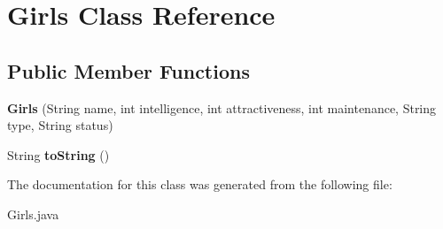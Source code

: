 \hypertarget{class_girls}{}\section{Girls Class Reference}
\label{class_girls}
\subsection*{Public Member Functions}
\begin{DoxyCompactItemize}
\item 
\mbox{\label{class_girls_a06ebadf127a171d48c408ec5909c43be}} 
{\bfseries Girls} (String name, int intelligence, int attractiveness, int maintenance, String type, String status)
\item 
\mbox{\label{class_girls_a4aafc646016319aa597e48502e756b65}} 
String {\bfseries to\+String} ()
\end{DoxyCompactItemize}


The documentation for this class was generated from the following file\+:\begin{DoxyCompactItemize}
\item 
Girls.\+java\end{DoxyCompactItemize}
